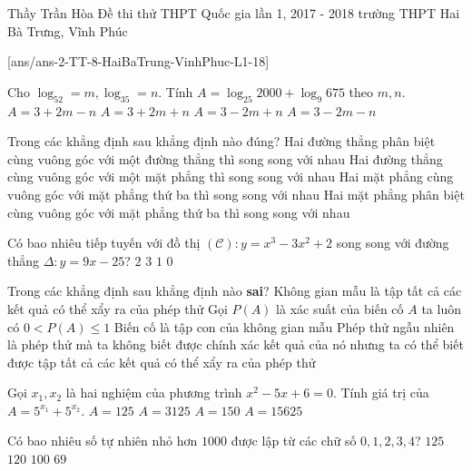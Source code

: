 
\begin{name}
{Thầy Trần Hòa}
{Đề thi thử THPT Quốc gia lần 1, 2017 - 2018 trường THPT Hai Bà Trưng, Vĩnh Phúc}
\end{name}
\setcounter{ex}{0}
[ans/ans-2-TT-8-HaiBaTrung-VinhPhuc-L1-18]
\begin{ex}%
Cho $\log_52=m, \log_35=n$. Tính $A=\log_{25}2000+\log_{9}675$ theo $m, n$.
\choice
{$A=3+2m-n$}
{\True $A=3+2m+n$}
{$A=3-2m+n$}
{$A=3-2m-n$}
\end{ex}

\begin{ex}%
Trong các khẳng định sau khẳng định nào đúng?
\choice
{Hai đường thẳng phân biệt cùng vuông góc với một đường thẳng thì song song với nhau}
{Hai đường thẳng cùng vuông góc với một mặt phẳng thì song song với nhau}
{Hai mặt phẳng cùng vuông góc với mặt phẳng thứ ba thì song song với nhau}
{\True Hai mặt phẳng phân biệt cùng vuông góc với mặt phẳng thứ ba thì song song với nhau}
\end{ex}

\begin{ex}%
Có bao nhiêu tiếp tuyến với đồ thị $\mathscr{(C)}: y=x^3-3x^2+2$ song song với đường thẳng $\Delta : y=9x-25$?
\choice
{\True $2$}
{$3$}
{$1$}
{$0$}
\end{ex}

\begin{ex}%
Trong các khẳng định sau khẳng định nào {\bf sai}?
\choice
{Không gian mẫu là tập tất cả các kết quả có thể xẩy ra của phép thử}
{\True Gọi $P(A)$ là xác suất của biến cố $A$ ta luôn có $0<P(A) \le 1$}
{Biến cố là tập con của không  gian mẫu}
{Phép thử ngẫu nhiên là phép thử mà ta không biết được chính xác kết quả của nó nhưng ta có thể biết được tập tất cả các kết quả có thể xẩy ra của phép thử}
\end{ex}

\begin{ex}%
Gọi $x_1, x_2$ là hai nghiệm của phương trình $x^2-5x+6=0$. Tính giá trị của $A=5^{x_1}+5^{x_2}$.
\choice
{$A=125$}
{$A=3125$}
{\True $A=150$}
{$A=15625$}
\end{ex}

\begin{ex}%
Có bao nhiêu số tự nhiên nhỏ hơn $1000$ được lập từ các chữ số $0, 1, 2, 3, 4$?
\choice
{$125$}
{$120$}
{\True $100$}
{$69$}
\end{ex}

